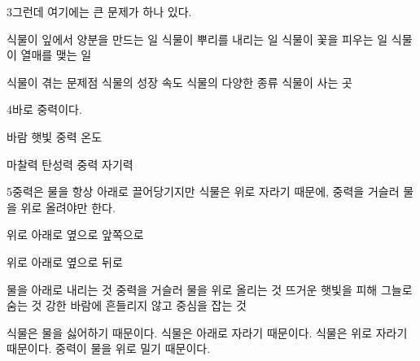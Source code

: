 \documentclass[fs85,seriesRus]{korfarm-base}
\begin{document}
\begin{kfSentenceUnit}{3}{그런데 여기에는 큰 문제가 하나 있다.}
\begin{kfChoices}
\kfChoice 식물이 잎에서 양분을 만드는 일
\kfChoice 식물이 뿌리를 내리는 일
\kfChoice 식물이 꽃을 피우는 일
\kfChoice 식물이 열매를 맺는 일
\end{kfChoices}
\begin{kfChoices}
\kfChoice 식물이 겪는 문제점
\kfChoice 식물의 성장 속도
\kfChoice 식물의 다양한 종류
\kfChoice 식물이 사는 곳
\end{kfChoices}
\end{kfSentenceUnit}

\begin{kfSentenceUnit}{4}{바로 중력이다.}
\begin{kfChoices}
\kfChoice 바람
\kfChoice 햇빛
\kfChoice 중력
\kfChoice 온도
\end{kfChoices}
\begin{kfChoices}
\kfChoice 마찰력
\kfChoice 탄성력
\kfChoice 중력
\kfChoice 자기력
\end{kfChoices}
\end{kfSentenceUnit}

\begin{kfSentenceUnit}{5}{중력은 물을 항상 아래로 끌어당기지만 식물은 위로 자라기 때문에, 중력을 거슬러 물을 위로 올려야만 한다.}
\begin{kfChoices}
\kfChoice 위로
\kfChoice 아래로
\kfChoice 옆으로
\kfChoice 앞쪽으로
\end{kfChoices}
\begin{kfChoices}
\kfChoice 위로
\kfChoice 아래로
\kfChoice 옆으로
\kfChoice 뒤로
\end{kfChoices}
\begin{kfChoices}
\kfChoice 물을 아래로 내리는 것
\kfChoice 중력을 거슬러 물을 위로 올리는 것
\kfChoice 뜨거운 햇빛을 피해 그늘로 숨는 것
\kfChoice 강한 바람에 흔들리지 않고 중심을 잡는 것
\end{kfChoices}
\begin{kfChoices}
\kfChoice 식물은 물을 싫어하기 때문이다.
\kfChoice 식물은 아래로 자라기 때문이다.
\kfChoice 식물은 위로 자라기 때문이다.
\kfChoice 중력이 물을 위로 밀기 때문이다.
\end{kfChoices}
\end{kfSentenceUnit}
\end{document}

